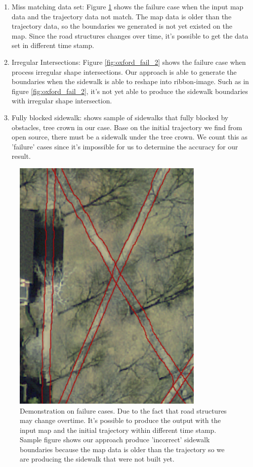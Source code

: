 \begin{enumerate}
    \item Miss matching data set: Figure \ref{fig:oxford_fail_1} shows the failure case when the input map data and the trajectory data not match. The map data is older than the trajectory data, so the boundaries we generated is not yet existed on the map. Since the road structures changes over time, it's possible to get the data set in different time stamp. 
    \item Irregular Intersections: Figure \ref{fig:oxford_fail_2} shows the failure case when process irregular shape intersections. Our approach is able to generate the boundaries when the sidewalk is able to reshape into ribbon-image. Such as in figure \ref{fig:oxford_fail_2}, it's not yet able to produce the sidewalk boundaries with irregular shape intersection.
    \item Fully blocked sidewalk:  shows sample of sidewalks that fully blocked by obstacles, tree crown in our case. Base on the initial trajectory we find from open source, there must be a sidewalk under the tree crown. We count this as 'failure' cases since it's impossible for us to determine the accuracy for our result. 
\end{enumerate}

\begin{figure}[H]
    \centering
    \includegraphics[width=0.83\textwidth]{Figures/oxford_fail_1.png}
    \caption[Failure Case 1]{Demonstration on failure cases. Due to the fact that road structures may change overtime. It's possible to produce the output with the input map and the initial trajectory within different time stamp. Sample figure shows our approach produce 'incorrect' sidewalk boundaries because the map data is older than the trajectory so we are producing the sidewalk that were not built yet.}
    \label{fig:oxford_fail_1}
\end{figure} 

